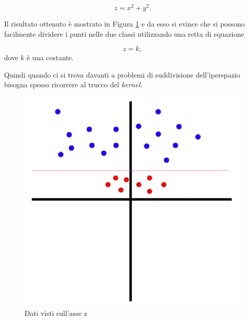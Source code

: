 \documentclass[12pt,italian]{report}
\begin{document}
\[ z = x^2 + y^2.\]

Il risultato ottenuto è mostrato in Figura \ref{fig:svc_on_z_axis} e da esso si evince che si possono facilmente dividere i punti nelle due classi utilizzando una retta di equazione

\[ z = k ,\]
dove $k$ è una costante.

Quindi quando ci si trova davanti a problemi di suddivisione dell'iperspazio bisogna spesso ricorrere al trucco del \emph{kernel}. 

\begin{figure}[h!]
	\center
	\includegraphics[scale=0.4]{../img/svc_on_z_axis} %
	\caption{Dati visti sull'asse z}
	\label{fig:svc_on_z_axis}
\end{figure}

\pagebreak
\end{document}
